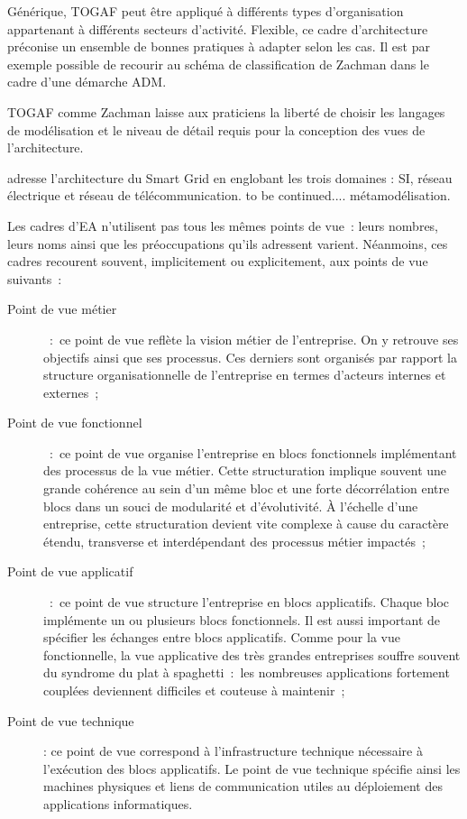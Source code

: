 Générique, TOGAF peut être appliqué à différents types d'organisation 
appartenant à différents secteurs d'activité. Flexible, ce cadre d'architecture 
préconise un ensemble de bonnes pratiques à adapter selon les cas. Il est par 
exemple possible de recourir au schéma de classification de Zachman dans le 
cadre d'une démarche ADM.

TOGAF comme Zachman laisse aux praticiens la liberté de choisir les langages de 
modélisation et le niveau de détail requis pour la conception des vues de 
l'architecture. 

%
adresse l'architecture du Smart Grid en englobant les trois domaines : SI, 
réseau électrique et réseau de télécommunication. to be continued....
%
%
%
%
%
%
métamodélisation. 


Les cadres d'EA n'utilisent pas tous les mêmes points de vue~: leurs nombres, 
leurs noms ainsi que les préoccupations qu'ils adressent varient. Néanmoins, ces 
cadres recourent souvent, implicitement ou explicitement, aux points de vue 
suivants~:

\begin{description}

\item[Point de vue métier]~:~ce point de vue reflète la vision métier de 
l'entreprise. On y retrouve ses objectifs ainsi que ses processus. Ces derniers 
sont organisés par rapport la structure organisationnelle de l'entreprise en 
termes d'acteurs internes et externes~;

\item[Point de vue fonctionnel]~:~ce point de vue organise l'entreprise en blocs 
fonctionnels implémentant des processus de la vue métier. Cette structuration 
implique souvent une grande cohérence au sein d'un même bloc et une forte 
décorrélation entre blocs dans un souci de modularité et d'évolutivité. À 
l'échelle d'une entreprise, cette structuration devient vite complexe à cause du 
caractère étendu, transverse et interdépendant des processus métier impactés~;

\item[Point de vue applicatif]~:~ce point de vue structure l'entreprise en blocs 
applicatifs. Chaque bloc implémente un ou plusieurs blocs fonctionnels. Il est 
aussi important de spécifier les échanges entre blocs applicatifs. Comme pour la 
vue fonctionnelle, la vue applicative des très grandes entreprises souffre 
souvent du syndrome du plat à spaghetti~:~les nombreuses applications fortement 
couplées deviennent difficiles et couteuse à maintenir~;

\item[Point de vue technique] : ce point de vue correspond à l'infrastructure 
technique nécessaire à l'exécution des blocs applicatifs. Le point de vue 
technique spécifie ainsi les machines physiques et liens de communication utiles 
au déploiement des applications informatiques. 
\end{description}

